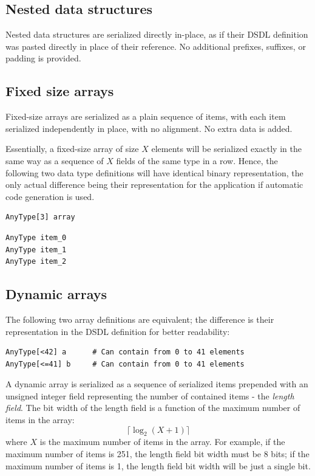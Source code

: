 \subsection{Nested data structures}

Nested data structures are serialized directly in-place,
as if their DSDL definition was pasted directly in place of their reference.
No additional prefixes, suffixes, or padding is provided.

\subsection{Fixed size arrays}

Fixed-size arrays are serialized as a plain sequence of items,
with each item serialized independently in place, with no alignment.
No extra data is added.

Essentially, a fixed-size array of size $X$ elements will be serialized exactly in the same way
as a sequence of $X$ fields of the same type in a row.
Hence, the following two data type definitions will have identical binary representation,
the only actual difference being their representation for the application
if automatic code generation is used.

\begin{verbatim}
AnyType[3] array
\end{verbatim}

\begin{verbatim}
AnyType item_0
AnyType item_1
AnyType item_2
\end{verbatim}

\subsection{Dynamic arrays}

The following two array definitions are equivalent;
the difference is their representation in the DSDL definition for better readability:
\begin{verbatim}
AnyType[<42] a      # Can contain from 0 to 41 elements
AnyType[<=41] b     # Can contain from 0 to 41 elements
\end{verbatim}

A dynamic array is serialized as a sequence of serialized items prepended with an unsigned
integer field representing the number of contained items - the \emph{length field}.
The bit width of the length field is a function of the maximum number of items in the array:
$$\lceil{}\log_2 (X + 1)\rceil{}$$
where $X$ is the maximum number of items in the array.
For example, if the maximum number of items is 251, the length field bit width must be 8 bits;
if the maximum number of items is 1, the length field bit width will be just a single bit.

